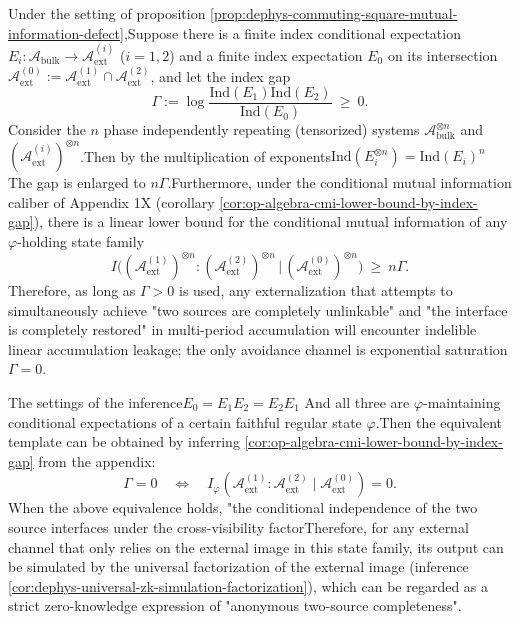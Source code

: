 \begin{corollary}\label{cor:dephys-multiplicity-index-gap-linear-cmi}Under the setting of proposition \ref{prop:dephys-commuting-square-mutual-information-defect},Suppose there is a finite index conditional expectation \(E_i:\mathcal{A}_{\mathrm{bulk}}\to \mathcal{A}_{\mathrm{ext}}^{(i)}\) (\(i=1,2\)) and a finite index expectation \(E_0\) on its intersection \(\mathcal{A}_{\mathrm{ext}}^{(0)}:=\mathcal{A}_{\mathrm{ext}}^{(1)}\cap\mathcal{A}_{\mathrm{ext}}^{(2)}\), and let the index gap\[
\Gamma:=\log\frac{\mathrm{Ind}(E_1)\mathrm{Ind}(E_2)}{\mathrm{Ind}(E_0)}\ \ge\ 0.
\]
Consider the \(n\) phase independently repeating (tensorized) systems \(\mathcal{A}_{\mathrm{bulk}}^{\otimes n}\) and \((\mathcal{A}_{\mathrm{ext}}^{(i)})^{\otimes n}\).Then by the multiplication of exponents\(
\mathrm{Ind}(E_i^{\otimes n})=\mathrm{Ind}(E_i)^n
\)
The gap is enlarged to \(n\Gamma\).Furthermore, under the conditional mutual information caliber of Appendix \SXPH1X (corollary \ref{cor:op-algebra-cmi-lower-bound-by-index-gap}), there is a linear lower bound for the conditional mutual information of any \(\varphi\)-holding state family\[
\boxed{\;
I\bigl((\mathcal{A}_{\mathrm{ext}}^{(1)})^{\otimes n}:(\mathcal{A}_{\mathrm{ext}}^{(2)})^{\otimes n}\,\big|\,(\mathcal{A}_{\mathrm{ext}}^{(0)})^{\otimes n}\bigr)
\ \ge\ n\Gamma.\;}
\]
Therefore, as long as \(\Gamma>0\) is used, any externalization that attempts to simultaneously achieve "two sources are completely unlinkable" and "the interface is completely restored" in multi-period accumulation will encounter indelible linear accumulation leakage; the only avoidance channel is exponential saturation \(\Gamma=0\).\end{corollary}

\begin{corollary}\label{cor:dephys-two-source-anonymy-completeness-template}The settings of the inference\(
E_0=E_1E_2=E_2E_1
\)
And all three are \(\varphi\)-maintaining conditional expectations of a certain faithful regular state \(\varphi\).Then the equivalent template can be obtained by inferring \ref{cor:op-algebra-cmi-lower-bound-by-index-gap} from the appendix:\[
\boxed{\;
\Gamma=0
\quad\Longleftrightarrow\quad
I_\varphi(\mathcal{A}^{(1)}_{\mathrm{ext}}:\mathcal{A}^{(2)}_{\mathrm{ext}}\mid\mathcal{A}^{(0)}_{\mathrm{ext}})=0.\;}
\]
When the above equivalence holds, "the conditional independence of the two source interfaces under the cross-visibility factorTherefore, for any external channel that only relies on the external image in this state family, its output can be simulated by the universal factorization of the external image (inference \ref{cor:dephys-universal-zk-simulation-factorization}), which can be regarded as a strict zero-knowledge expression of "anonymous two-source completeness".\end{corollary}

